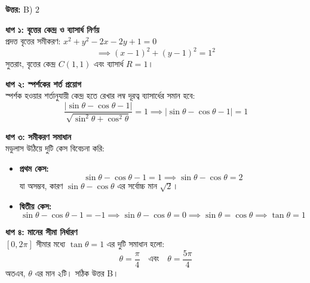 \documentclass[12pt, a4paper]{article}
\begin{document}
\vspace{0.5em}
\begin{tcolorbox}[answerbox]
    \textbf{\color{success} উত্তর:} B) $2$
\end{tcolorbox}
\vspace{1em}

\begin{tcolorbox}[solutionbox={সমাধান (Solution)}]
    \noindent
    \textbf{ধাপ ১: বৃত্তের কেন্দ্র ও ব্যাসার্ধ নির্ণয়} \\
    প্রদত্ত বৃত্তের সমীকরণ: $x^2 + y^2 - 2x - 2y + 1 = 0$
    \[ \implies (x - 1)^2 + (y - 1)^2 = 1^2 \]
    সুতরাং, বৃত্তের কেন্দ্র $C(1, 1)$ এবং ব্যাসার্ধ $R = 1$।
    
    \vspace{0.5em}
    \noindent\textbf{ধাপ ২: স্পর্শকের শর্ত প্রয়োগ} \\
    স্পর্শক হওয়ার শর্তানুযায়ী কেন্দ্র হতে রেখার লম্ব দূরত্ব ব্যাসার্ধের সমান হবে:
    \[ \frac{|\sin\theta - \cos\theta - 1|}{\sqrt{\sin^2\theta + \cos^2\theta}} = 1 \implies |\sin\theta - \cos\theta - 1| = 1 \]
    
    \vspace{0.5em}
    \noindent\textbf{ধাপ ৩: সমীকরণ সমাধান} \\
    মডুলাস উঠিয়ে দুটি কেস বিবেচনা করি:
    \begin{itemize}
        \item \textbf{প্রথম কেস:} 
        \[ \sin\theta - \cos\theta - 1 = 1 \implies \sin\theta - \cos\theta = 2 \]
        যা অসম্ভব, কারণ $\sin\theta - \cos\theta$ এর সর্বোচ্চ মান $\sqrt{2}$।
        \item \textbf{দ্বিতীয় কেস:} 
        \[ \sin\theta - \cos\theta - 1 = -1 \implies \sin\theta - \cos\theta = 0 \implies \sin\theta = \cos\theta \implies \tan\theta = 1 \]
    \end{itemize}
    
    \vspace{0.5em}
    \noindent\textbf{ধাপ ৪: মানের সীমা নির্ধারণ} \\
    $[0, 2\pi]$ সীমার মধ্যে $\tan\theta = 1$ এর দুটি সমাধান হলো:
    \[ \theta = \frac{\pi}{4} \quad \text{এবং} \quad \theta = \frac{5\pi}{4} \]
    অতএব, $\theta$ এর মান ২টি। সঠিক উত্তর B।
\end{tcolorbox}
\end{document}
